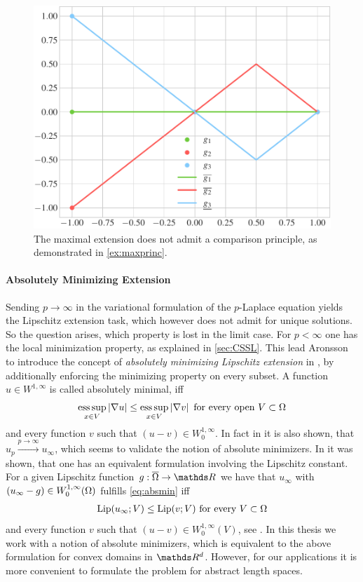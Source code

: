 %
\begin{figure}
\centering
\includegraphics[width=.5\textwidth]{code/lipextcomp/comp.pdf}
\caption[Visualization for \cref{ex:maxprinc}.]{The maximal extension does not admit a comparison principle, as demonstrated in \cref{ex:maxprinc}.}\label{fig:maxprinc}
\end{figure}
%
%
\paragraph{Absolutely Minimizing Extension}\label{sec:AMLE}
%
Sending $p\to\infty$ in the variational formulation of the $p$-Laplace equation 
yields the Lipschitz extension task, which however does not admit for unique solutions. So the question arises, which property is lost in the limit case. For $p<\infty$ one has the local minimization property, as explained in \cref{sec:CSSL}. This lead Aronsson to introduce the concept of \emph{absolutely minimizing Lipschitz extension} in \cite{aronsson1967extension}, by additionally enforcing the minimizing property on every subset. A function $u\in W^{1,\infty}$ is called absolutely minimal, iff
%
\begin{align}\label{eq:absmin}
\operatorname*{ess\,sup}_{x\in V} \left|\nabla u\right| \leq \operatorname*{ess\,sup}_{x\in V} \left|\nabla v\right| \text{ for every open } V\subset \Omega
\end{align}
%
and every function $v$ such that $(u-v)\in W^{1,\infty}_0$. In fact in \cite{aronsson1967extension} it is also shown, that 
$u_p\xrightarrow{p\to\infty} u_\infty$, which seems to validate the notion of absolute minimizers. In \cite{aronsson2004tour} it was shown, that one has an equivalent formulation involving the Lipschitz constant. For a given Lipschitz function $g:\overline{\domain}\to\R$ we have that $u_\infty$ with $(u_\infty-g)\in W^{1,\infty}_0(\Omega)$ fulfills \cref{eq:absmin} iff
%
\begin{align*}
\operatorname{Lip}(u_\infty; V) \leq \operatorname{Lip}(v; V) \text{ for every } V\subset \Omega
\end{align*}
%
and every function $v$ such that $(u-v)\in W^{1,\infty}_0(V)$, see \cite{aronsson1967extension}. In this thesis we work with a notion of absolute minimizers, which is equivalent to the above formulation for convex domains in $\R^d$. However, for our applications it is more convenient to formulate the problem for abstract length spaces.
